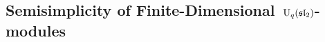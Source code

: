 \documentclass[a4paper, 11pt, oneside]{scrartcl}
\begin{document}
\subsection{Semisimplicity of Finite-Dimensional~$\operatorname{U}_q(\mathfrak{sl}_2)$-modules}

%
\end{document}

